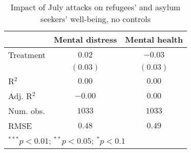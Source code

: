 
\begin{table}
\caption{Impact of July attacks on refugees' and asylum seekers' well-being, no controls}
\begin{center}
\begin{tabular}{l c c}
\toprule
 & Mental distress & Mental health \\
\midrule
Treatment  & $0.02$   & $-0.03$  \\
           & $(0.03)$ & $(0.03)$ \\
\midrule
R$^2$      & $0.00$   & $0.00$   \\
Adj. R$^2$ & $-0.00$  & $0.00$   \\
Num. obs.  & $1033$   & $1033$   \\
RMSE       & $0.48$   & $0.49$   \\
\bottomrule
\multicolumn{3}{l}{\scriptsize{$^{***}p<0.01$; $^{**}p<0.05$; $^{*}p<0.1$}}
\end{tabular}
\label{tab_mhealth_no_controls}
\end{center}
\end{table}

